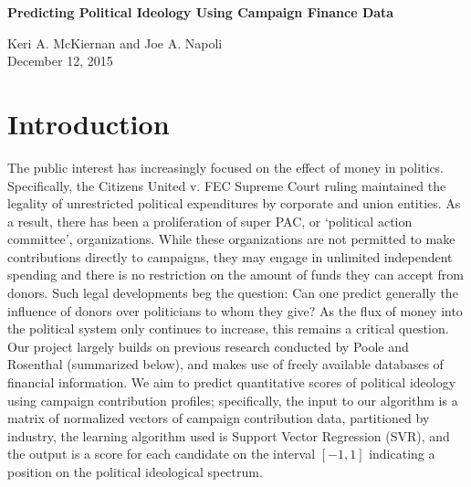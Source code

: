 \documentclass[12]{article}
\begin{document}
\begin{center}
\huge{\textbf{Predicting Political Ideology Using Campaign Finance Data}} \\
\end{center}
\begin{center}
\large{Keri A. McKiernan and Joe A. Napoli \\
\vspace{.25em}
December 12, 2015}
\end{center}
\section*{Introduction}

\noindent The public interest has increasingly focused on the effect of money in politics. Specifically, the Citizens United v. FEC Supreme Court ruling maintained the legality of unrestricted political expenditures by corporate and union entities. As a result, there has been a proliferation of super PAC, or `political action committee',  organizations. While these organizations are not permitted to make contributions directly to campaigns, they may engage in unlimited independent spending and there is no restriction on the amount of funds they can accept from donors. Such legal developments beg the question: Can one predict generally the influence of donors over politicians to whom they give? As the flux of money into the political system only continues to increase, this remains a critical question. Our project largely builds on previous research conducted by Poole and Rosenthal (summarized below), and makes use of freely available databases of financial information. We aim to predict quantitative scores of political ideology using campaign contribution profiles; specifically, the input to our algorithm is a matrix of normalized vectors of campaign contribution data, partitioned by industry, the learning algorithm used is Support Vector Regression (SVR), and the output is a score for each candidate on the interval $[-1,1]$ indicating a position on the political ideological spectrum.
\end{document}
